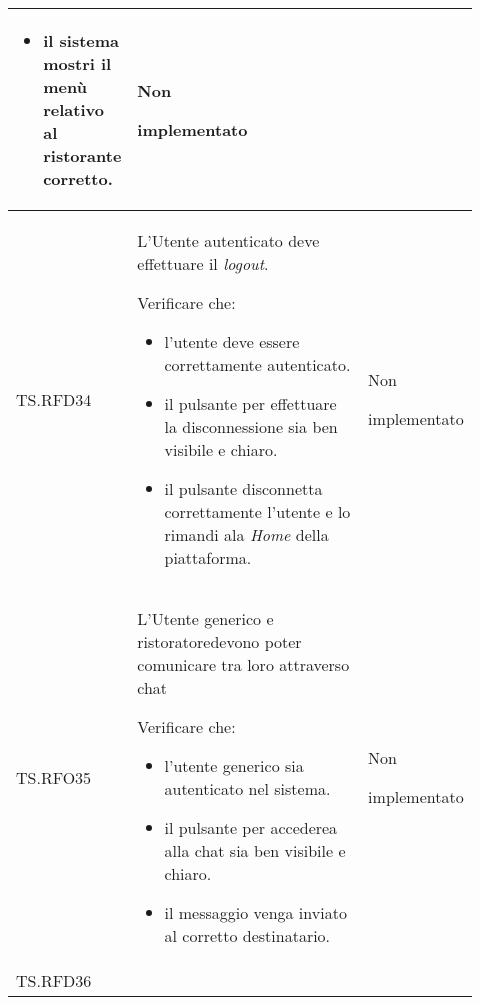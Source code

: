 \begin{longtable}{|p{0.10\linewidth}|p{0.70\linewidth}|p{0.12\linewidth}|}
\begin{itemize}
		\item il sistema mostri il menù relativo al ristorante corretto.
	\end{itemize}                                                                &
	Non \par implementato                                                                                                                                                   \\
	\hline
	TS.RFD34                                                                                                                        &
	L'Utente autenticato deve effettuare il \textit{logout}. \par
	Verificare che:
	\begin{itemize}
		\item l'utente deve essere correttamente autenticato.
		\item il pulsante per effettuare la disconnessione sia ben visibile e chiaro.
		\item il pulsante disconnetta correttamente l'utente e lo rimandi ala \textit{Home} della piattaforma.
	\end{itemize}                          &
	Non \par implementato                                                                                                                                                   \\
	\hline
	TS.RFO35                                                                                                                        &
	L'Utente generico e ristoratore\g devono poter comunicare tra loro attraverso chat \par
	Verificare che:
	\begin{itemize}
		\item l'utente generico sia autenticato nel sistema.
		\item il pulsante per accederea alla chat sia ben visibile e chiaro.
		\item il messaggio venga inviato al corretto destinatario.
	\end{itemize}                                                            &
	Non \par implementato                                                                                                                                                   \\
	\hline
	TS.RFD36                                                                                                                        &

\end{longtable}
